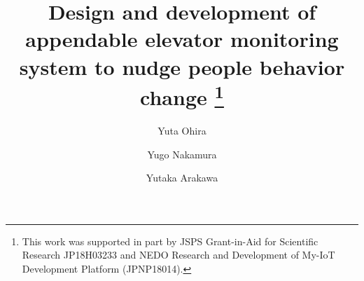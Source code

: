 \documentclass[runningheads]{llncs}
\begin{document}
\title{
  Design and development of appendable elevator monitoring system to nudge people behavior change
  \thanks{This work was supported in part by JSPS Grant-in-Aid for Scientific Research JP18H03233 and NEDO Research and Development of My-IoT Development Platform (JPNP18014).}
}

\author{
  Yuta Ohira \and
  Yugo Nakamura \and
  Yutaka Arakawa
}



\maketitle








%
%
%

% 
% 

\end{document}
